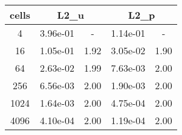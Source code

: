 \documentclass[10pt]{report}
\begin{document}
\begin{table}[H]
\begin{center}
\begin{tabular}{|c|c|c|c|c|} \hline
cells & 
\multicolumn{2}{|c|}{L2_u} & 
\multicolumn{2}{|c|}{L2_p}\\ \hline
4 & 3.96e-01 & - & 1.14e-01 & -\\ \hline
16 & 1.05e-01 & 1.92 & 3.05e-02 & 1.90\\ \hline
64 & 2.63e-02 & 1.99 & 7.63e-03 & 2.00\\ \hline
256 & 6.56e-03 & 2.00 & 1.90e-03 & 2.00\\ \hline
1024 & 1.64e-03 & 2.00 & 4.75e-04 & 2.00\\ \hline
4096 & 4.10e-04 & 2.00 & 1.19e-04 & 2.00\\ \hline
\end{tabular}
\end{center}
\end{table}
\end{document}
